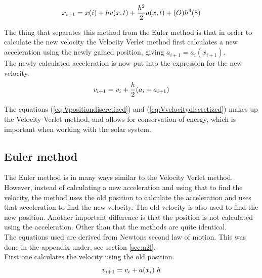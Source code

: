 \documentclass{article}
\begin{document}
    \begin{equation}    \label{eq:Vpositiondiscretized}
        x_{i+1} = x(i) + h v(x,t) + \frac{h^{2}}{2} a(x,t) + (O)h^{4} (8)\\
    \end{equation}

    The thing that separates this method from the Euler method is that in order to calculate the new velocity the Velocity Verlet method first calculates a new acceleration using the newly gained position, giving $a_{i+1} = a_i (x_{i+1})$. \\

    The newly calculated acceleration is now put into the expression for the new velocity. \\

    \begin{equation}    \label{eq:Vvelocitydiscretized}
        v_{i+1} = v_i + \frac{h}{2} (a_i+a_{i+1})  \\
    \end{equation}

    The equations (\ref{eq:Vpositiondiscretized}) and (\ref{eq:Vvelocitydiscretized}) makes up the Velocity Verlet method, and allows for conservation of energy, which is important when working with the solar system. \\

\subsection{Euler method}

    The Euler method is in many ways similar to the Velocity Verlet method. However, instead of calculating a new acceleration and using that to find the velocity, the method uses the old position to calculate the acceleration and uses that acceleration to find the new velocity. The old velocity is also used to find the new position. Another important difference is that the position is not calculated using the acceleration. Other than that the methods are quite identical. \\

    The equations used are derived from Newtons second law of motion. This was done in the appendix under, see section \ref{sec:n2l}. \\

    First one calculates the velocity using the old position. \\

    \begin{equation}    \label{eq:Evelocity}
        v_{i+1} = v_i +  a(x_i) \; h \\
    \end{equation}
\end{document}
